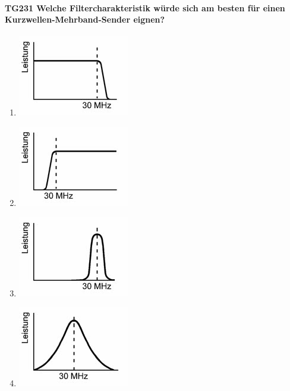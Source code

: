 \documentclass[8pt]{article}
\begin{document}
\paragraph*{TG231 Welche Filtercharakteristik würde sich am besten für einen Kurzwellen-Mehrband-Sender eignen?}
\begin{enumerate}[nolistsep,label=\Alph*]
\item
\begin{center}
	\begin{minipage}{\linewidth}
		\centering
		\includegraphics[scale=1.0]{pics/tg231_a.jpg}
	\end{minipage}
\end{center}
\item
\begin{center}
	\begin{minipage}{\linewidth}
		\centering
		\includegraphics[scale=1.0]{pics/tg231_b.jpg}
	\end{minipage}
\end{center}
\item
\begin{center}
	\begin{minipage}{\linewidth}
		\centering
		\includegraphics[scale=1.0]{pics/tg231_c.jpg}
	\end{minipage}
\end{center}
\item
\begin{center}
	\begin{minipage}{\linewidth}
		\centering
		\includegraphics[scale=1.0]{pics/tg231_d.jpg}
	\end{minipage}
\end{center}
\end{enumerate}
\end{document}
